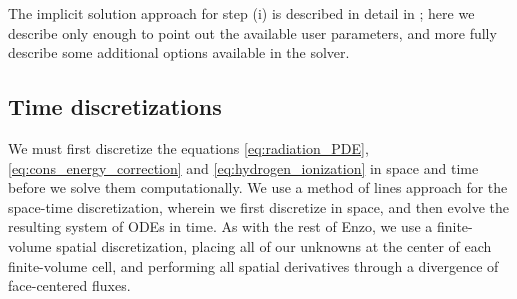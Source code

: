 \documentclass[letterpaper,10pt]{article}
\renewcommand{\(}{\left(}
\renewcommand{\)}{\right)}
\begin{document}
The implicit solution approach for step (i) is described in detail in 
\cite{ReynoldsHayesPaschosNorman2009}; here we describe only enough
to point out the available user parameters, and more fully describe
some additional options available in the solver.

\subsection{Time discretizations}
\label{sec:iqss}

We must first discretize the equations \eqref{eq:radiation_PDE},
\eqref{eq:cons_energy_correction} and \eqref{eq:hydrogen_ionization}
in space and time before we solve them computationally.  We use a
method of lines approach for the space-time discretization, wherein we
first discretize in space, and then evolve the resulting system of
ODEs in time.  As with the rest of Enzo, we use a finite-volume
spatial discretization, placing all of our unknowns at the center of
each finite-volume cell, and performing all spatial derivatives
through a divergence of face-centered fluxes.  
\end{document}
